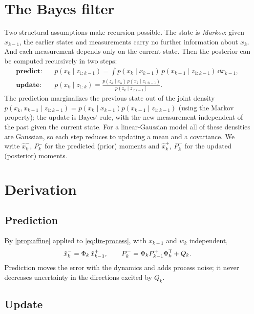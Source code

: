 \section{The Bayes filter}

Two structural assumptions make recursion possible. The state is \emph{Markov}: given $x_{k-1}$, the earlier states and measurements carry no
further information about $x_k$. And each measurement depends only on the current state. Then the posterior can be computed recursively in two
steps:
\begin{align}
  \textbf{predict:}&\quad p(x_k \mid z_{1:k-1}) = \int p(x_k \mid x_{k-1})\, p(x_{k-1}\mid z_{1:k-1})\,\dd x_{k-1}, \\
  \textbf{update:}&\quad p(x_k \mid z_{1:k}) = \frac{p(z_k \mid x_k)\, p(x_k \mid z_{1:k-1})}{p(z_k\mid z_{1:k-1})}.
\end{align}
The prediction marginalizes the previous state out of the joint density $p(x_k, x_{k-1}\mid z_{1:k-1}) = p(x_k\mid x_{k-1})p(x_{k-1}\mid z_{1:k-1})$ (using the
Markov property); the update is Bayes' rule, with the new measurement independent of the past given the current state. For a linear-Gaussian
model all of these densities are Gaussian, so each step reduces to updating a mean and a covariance. We write $\hat x_k^-$, $P_k^-$ for the predicted
(prior) moments and $\hat x_k^+$, $P_k^+$ for the updated (posterior) moments.

\section{Derivation}

\subsection{Prediction}

By \cref{prop:affine} applied to \eqref{eq:lin-process}, with $x_{k-1}$ and $w_k$ independent,
\begin{equation}
  \hat x_k^- = \Phi_k\,\hat x_{k-1}^+, \qquad P_k^- = \Phi_k P_{k-1}^+\Phi_k^{\mathsf{T}} + Q_k .
  \label{eq:kf-predict}
\end{equation}
Prediction moves the error with the dynamics and adds process noise; it never decreases uncertainty in the directions excited by $Q_k$.

\subsection{Update}

